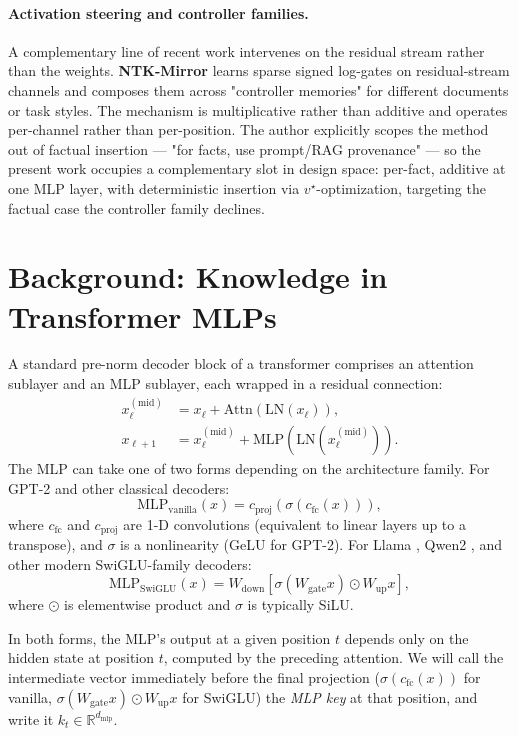 \documentclass[11pt,a4paper]{article}
\newcommand{\R}{\mathbb{R}}
\begin{document}
\paragraph{Activation steering and controller families.}
A complementary line of recent work intervenes on the residual stream
rather than the weights. \textbf{NTK-Mirror} \citep{chlon2026ntkmirror}
learns sparse signed log-gates on residual-stream channels and composes
them across "controller memories" for different documents or
task styles. The mechanism is multiplicative rather than additive and
operates per-channel rather than per-position. The author explicitly
scopes the method out of factual insertion --- "for facts, use
prompt/RAG provenance" --- so the present work occupies a complementary
slot in design space: per-fact, additive at one MLP layer, with
deterministic insertion via $v^\star$-optimization, targeting the
factual case the controller family declines.

\section{Background: Knowledge in Transformer MLPs}

A standard pre-norm decoder block of a transformer comprises an
attention sublayer and an MLP sublayer, each wrapped in a residual
connection:
\begin{align}
x_\ell^{(\text{mid})} &= x_\ell + \text{Attn}(\text{LN}(x_\ell)), \\
x_{\ell+1} &= x_\ell^{(\text{mid})} + \text{MLP}(\text{LN}(x_\ell^{(\text{mid})})).
\end{align}
The MLP can take one of two forms depending on the architecture family.
For GPT-2 \citep{radford2019gpt2} and other classical decoders:
\begin{equation}
\text{MLP}_{\text{vanilla}}(x) = c_\text{proj}(\sigma(c_\text{fc}(x))),
\end{equation}
where $c_\text{fc}$ and $c_\text{proj}$ are 1-D convolutions
(equivalent to linear layers up to a transpose), and $\sigma$ is a
nonlinearity (GeLU for GPT-2). For Llama \citep{touvron2023llama}, Qwen2
\citep{yang2024qwen2}, and other modern SwiGLU-family decoders:
\begin{equation}
\text{MLP}_{\text{SwiGLU}}(x) = W_\text{down} \left[ \sigma(W_\text{gate} x) \odot W_\text{up} x \right],
\end{equation}
where $\odot$ is elementwise product and $\sigma$ is typically SiLU.

In both forms, the MLP's output at a given position $t$ depends only on
the hidden state at position $t$, computed by the preceding attention.
We will call the intermediate vector immediately before the final
projection ($\sigma(c_\text{fc}(x))$ for vanilla,
$\sigma(W_\text{gate} x) \odot W_\text{up} x$ for SwiGLU) the
\emph{MLP key} at that position, and write it $k_t \in \R^{d_\text{mlp}}$.
\end{document}

